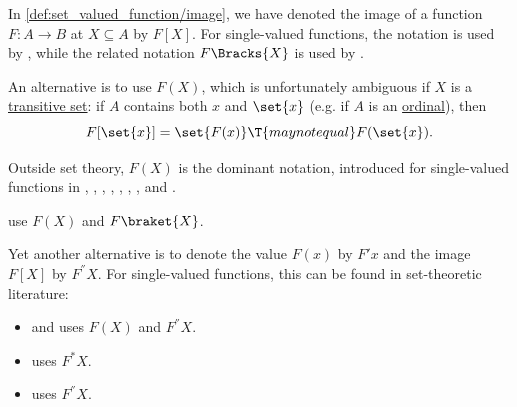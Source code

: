 \begin{remark}\label{rem:notation_for_function_image}
  In \cref{def:set_valued_function/image}, we have denoted the image of a function \( F: A \to B \) at \( X \subseteq A \) by \( F[X] \). For single-valued functions, the notation is used by \textcite[11]{Kelley1975GeneralTopology}, while the related notation \( F\Bracks{X} \) is used by \textcite[44]{Enderton1977SetTheory}.

  An alternative is to use \( F(X) \), which is unfortunately ambiguous if \( X \) is a \hyperref[def:transitive_set]{transitive set}: if \( A \) contains both \( x \) and \( \set{ x } \) (e.g. if \( A \) is an \hyperref[def:ordinal]{ordinal}), then
  \begin{equation*}
    F[\set{ x }] = \set{ F(x) } \T{may not equal} F(\set{ x }).
  \end{equation*}

  Outside set theory, \( F(X) \) is the dominant notation, introduced for single-valued functions in
  \cite[31]{Halmos1960NaiveSetTheory},
  \cite[1]{Engelking1989GeneralTopology},
  \cite[4]{Willard2004GeneralTopology},
  \cite[def. 2.2]{Rudin1976AnalysisPrinciples},
  \cite[3]{Folland1999RealAnalysis},
  \cite[12]{WheedenZygmund2015MeasureAndIntegral},
  \cite[\S 1.2.5]{КусраевКутателадзе2005БулевозначныйАнализ},
  \cite[46]{БелоусовТкачёв2004ДискретнаяМатематика} and
  \cite[33]{ШеньВерещагин2020НачалаТеорииМножеств}.

  \Textcite[def. II.2.3]{Bourbaki2004TheoryOfSets} use \( F(X) \) and \( F\braket{ X } \).

  Yet another alternative is to denote the value \( F(x) \) by \( F'x \) and the image \( F[X] \) by \( F^\dprime X \). For single-valued functions, this can be found in set-theoretic literature:
  \begin{itemize}
    \item \Textcite[21]{Jech2006SetTheory} and \textcite[def. I.6.12]{Kunen2013SetTheory} uses \( F(X) \) and \( F^\dprime X \).
    \item \Textcite[def. 6.2.10]{Hinman2005Logic} uses \( F^* X \).
    \item \Textcite[245]{Mendelson2015Logic} uses \( F^\dprime X \).
  \end{itemize}
\end{remark}

